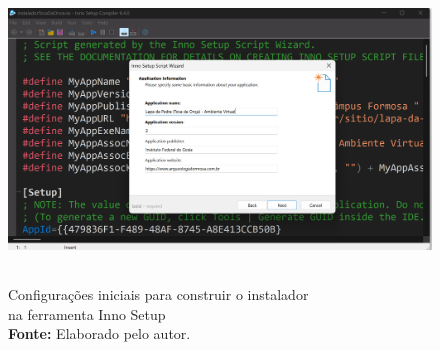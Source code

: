 \begin{figure}[H]
        \centering
        \includegraphics[height=8cm, keepaspectratio]{img/Inno setup/configuracao do instalador.png}
        \caption{Configurações iniciais para construir o instalador \\ na ferramenta Inno Setup \\
            \textbf{Fonte:} Elaborado pelo autor.}
        \label{fig:configuracao_inno_setup}
\end{figure}

